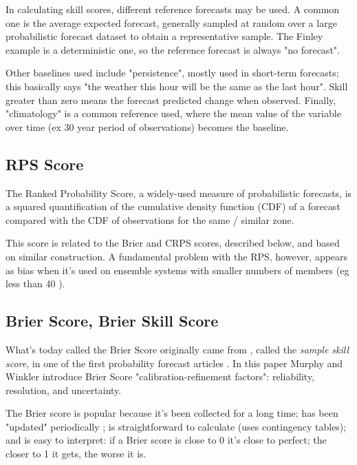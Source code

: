 \documentclass[logos,parttoc,morelanguage=french,morelanguage=german,draft]{orsay-memoire}
\begin{document}
In calculating skill scores, different reference forecasts may be used. A common one is the average expected forecast, generally sampled at random over a large probabilistic forecast dataset to obtain a representative sample. The Finley example is a deterministic one, so the reference forecast is always "no forecast".

Other baselines used include "persistence", mostly used in short-term forecasts; this basically says "the weather this hour will be the same as the last hour". Skill greater than zero means the forecast predicted change when observed. Finally, "climatology" is a common reference used, where the mean value of the variable over time (ex 30 year period of observations) becomes the baseline. \autocite{JolliffeIanT.andStephenson2012ForecastVerification}

\subsection{RPS Score}

The Ranked Probability Score, a widely-used measure of probabilistic forecasts, is a squared quantification of the cumulative density function (CDF) of a forecast compared with the CDF of observations for the same / similar zone. 

This score is related to the Brier and CRPS scores, described below, and based on similar construction. A fundamental problem with the RPS, however, appears as bias when it's used on ensemble systems with smaller numbers of members (eg less than 40 \autocite{weigel2007discrete}).

\subsection{Brier Score, Brier Skill Score}

What's today called the Brier Score originally came from \autocite{brier1950verification}, called the \textit{sample skill score}, in one of the first probability forecast articles \autocite{Murphy1974ProbabilityForecasters}. In this paper Murphy and Winkler introduce Brier Score "calibration-refinement factors": reliability, resolution, and uncertainty.

The Brier score is popular because it's been collected for a long time; has been "updated" periodically \autocite{Murphy1974ProbabilityForecasters}; is straightforward to calculate (uses contingency tables); and is easy to interpret: if a Brier score is close to 0 it's close to perfect; the closer to 1 it gets, the worse it is.
\end{document}
